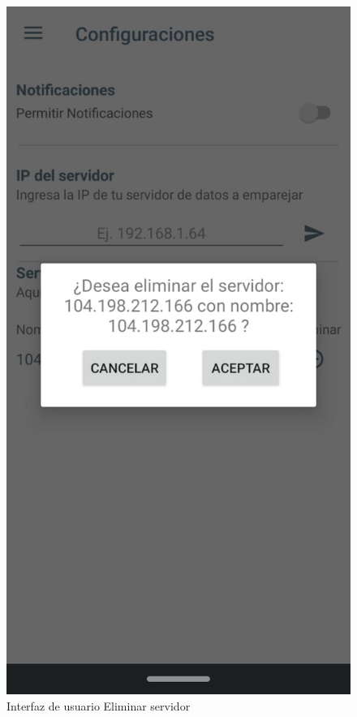 \begin{figure}[H]
	\centering
	\includegraphics[scale=0.4]{Capitulo4/software/submodulos/images/man35.png}
	\caption{Interfaz de usuario Eliminar servidor}
	\label{fig:Eliminar servidor}
\end{figure}

